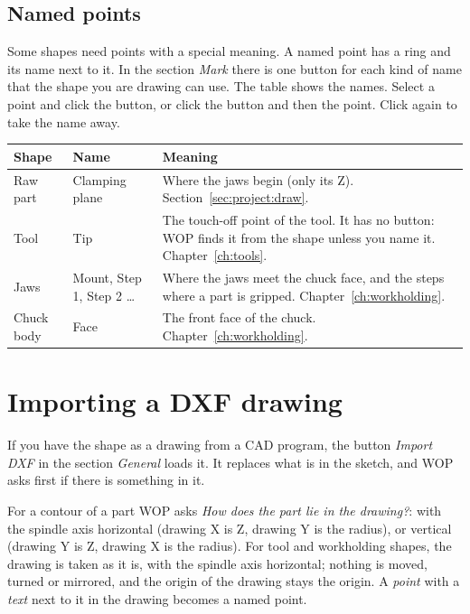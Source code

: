 \subsection{Named points}\label{sec:sketch:names}
Some shapes need points with a special meaning. A named point has a ring and its name next to it. In the section \emph{Mark} there is one button for each kind of name that the shape you are drawing can use. The table shows the names. Select a point and click the button, or click the button and then the point. Click again to take the name away.

\begin{center}
\begin{tabularx}{\textwidth}{@{}l l Y@{}}
\toprule
\textbf{Shape} & \textbf{Name} & \textbf{Meaning} \\
\midrule
Raw part & Clamping plane & Where the jaws begin (only its Z). Section~\ref{sec:project:draw}. \\
Tool & Tip & The touch-off point of the tool. It has no button: WOP finds it from the shape unless you name it. Chapter~\ref{ch:tools}. \\
Jaws & Mount, Step 1, Step 2 \ldots & Where the jaws meet the chuck face, and the steps where a part is gripped. Chapter~\ref{ch:workholding}. \\
Chuck body & Face & The front face of the chuck. Chapter~\ref{ch:workholding}. \\
\bottomrule
\end{tabularx}
\end{center}

\section{Importing a DXF drawing}\label{sec:sketch:dxf}

If you have the shape as a drawing from a CAD program, the button \emph{Import DXF} in the section \emph{General} loads it. It replaces what is in the sketch, and WOP asks first if there is something in it.

For a contour of a part WOP asks \emph{How does the part lie in the drawing?}: with the spindle axis horizontal (drawing X is Z, drawing Y is the radius), or vertical (drawing Y is Z, drawing X is the radius). For tool and workholding shapes, the drawing is taken as it is, with the spindle axis horizontal; nothing is moved, turned or mirrored, and the origin of the drawing stays the origin. A \emph{point} with a \emph{text} next to it in the drawing becomes a named point.

